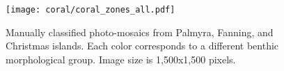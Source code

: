 \begin{figure}[htbp] %
   \centering
   \texttt{[image: coral/coral\_zones\_all.pdf]} 
   \caption{Manually classified photo-mosaics from Palmyra, Fanning, and Christmas islands. Each color corresponds to a different benthic morphological group. Image size is 1,500x1,500 pixels.}
   \label{coral_zones}
\end{figure}

















%
